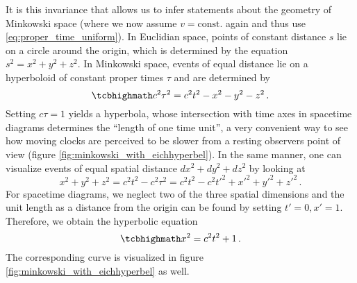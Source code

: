 It is this invariance that allows us to infer statements about the geometry of Minkowski space (where we now assume $v = \text{const.}$ again and thus use \eqref{eq:proper_time_uniform}). In Euclidian space, points of constant distance $s$ lie on a circle around the origin, which is determined by the equation $s^2 = x^2 + y^2 + z^2$. In Minkowski space, events of equal distance lie on a hyperboloid of constant proper times $\tau$ and are determined by
\begin{equation}\label{eq:eichhyperbel}
	\eqbox{
	c^2 \tau^2 = c^2 t^2 - x^2 - y^2 - z^2
	} \, .
\end{equation}
Setting $c \tau = 1$ yields a hyperbola, whose intersection with time axes in spacetime diagrams determines the \enquote{length of one time unit}, a very convenient way to see how moving clocks are perceived to be slower from a resting observers point of view (figure \ref{fig:minkowski_with_eichhyperbel}). In the same manner, one can visualize events of equal spatial distance $dx^2 + dy^2 + dz^2$ by looking at
\begin{equation*}
	x^2 + y^2 + z^2 = c^2 t^2 - c^2 \tau^2 = c^2 t^2 - c^2 t'^2 + x'^2 + y'^2 + z'^2
	\, .
\end{equation*}
For spacetime diagrams, we neglect two of the three spatial dimensions and the unit length as a distance from the origin can be found by setting $t' = 0, x' = 1$. Therefore, we obtain the hyperbolic equation
\begin{equation}
	\eqbox{
	x^2 = c^2 t^2 + 1
	} \, .
\end{equation}
The corresponding curve is visualized in figure \ref{fig:minkowski_with_eichhyperbel} as well.\\



